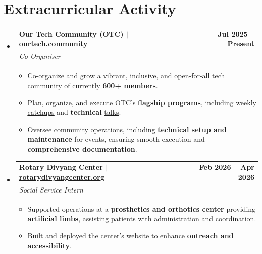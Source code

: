 \documentclass[letterpaper,11pt]{article}
\makeatletter
\newcommand{\resumeItem}[1]{
  \item\small{
    {#1 \vspace{-1pt}}
  }
}
\newcommand{\resumeSubheading}[4]{
  \vspace{-2pt}\item
    \begin{tabular*}{1.0\textwidth}[t]{l@{\extracolsep{\fill}}r}
      \vspace{-2pt}\textbf{#1} & \textbf{\small #2} \\[2pt]
      \textit{\small#3} & \textit{\small #4} \\
    \end{tabular*}\vspace{-6pt}
} %
\newcommand{\resumeSubHeadingListStart}{\begin{itemize}[leftmargin=0.0in, label={}]}
\newcommand{\resumeSubHeadingListEnd}{\end{itemize}}
\newcommand{\resumeItemListStart}{\begin{itemize}}
\newcommand{\resumeItemListEnd}{\end{itemize}\vspace{-4pt}}
\makeatother
\begin{document}
\section{Extracurricular Activity}
    \resumeSubHeadingListStart
        \resumeSubheading
            {\textbf{\normalsize{Our Tech Community (OTC)}} $|$ {\normalfont \href{https://ourtech.community}{\underline{ourtech.community}}}}{Jul 2025 -- Present}
            {Co-Organiser}{}
            \resumeItemListStart
                \resumeItem{Co-organize and grow a vibrant, inclusive, and open-for-all tech community of currently \textbf{600+ members}.}
                \resumeItem{Plan, organize, and execute OTC's \textbf{flagship programs}, including weekly \href{https://catchup.ourtech.community/}{\underline{catchups}} and \textbf{technical} \href{https://talks.ourtech.community/}{\underline{talks}}.}
                \resumeItem{Oversee community operations, including \textbf{technical setup and maintenance} for events, ensuring smooth execution and \textbf{comprehensive documentation}.}
            \resumeItemListEnd
            \vspace{3pt}

    \resumeSubheading
        {\textbf{\normalsize{Rotary Divyang Center}} $|$ {\normalfont \href{https://rotarydivyangcenter.org}{\underline{rotarydivyangcenter.org}}}}{Feb 2026 -- Apr 2026}
        {Social Service Intern}{}
        \resumeItemListStart
            \resumeItem{Supported operations at a \textbf{prosthetics and orthotics center} providing \textbf{artificial limbs}, assisting patients with administration and coordination.}
            \resumeItem{Built and deployed the center's website to enhance \textbf{outreach and accessibility}.}
        \resumeItemListEnd
    \resumeSubHeadingListEnd
\vspace{-12pt}
\end{document}
